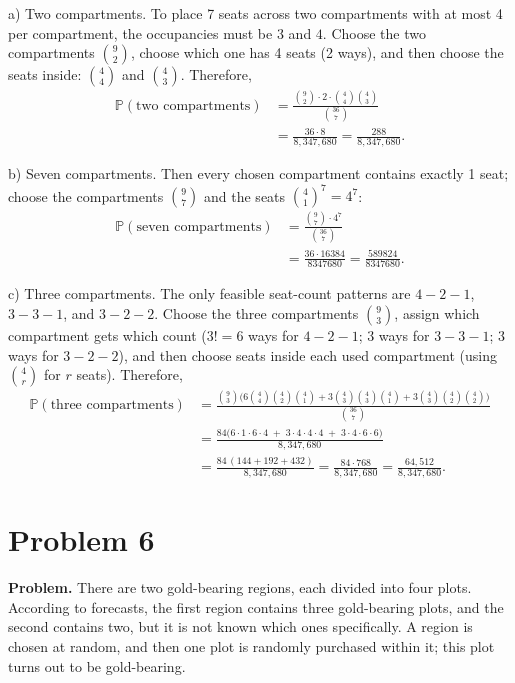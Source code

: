 \documentclass{article}
\begin{document}
a) Two compartments. To place 7 seats across two compartments with at most 4 per compartment, the occupancies must be \(3\) and \(4\). Choose the two compartments \(\binom{9}{2}\), choose which one has 4 seats (2 ways), and then choose the seats inside: \(\binom{4}{4}\) and \(\binom{4}{3}\). Therefore,
\begin{align*}
\mathbb{P}(\text{two compartments})
&= \frac{\binom{9}{2}\cdot 2 \cdot \binom{4}{4}\binom{4}{3}}{\binom{36}{7}} \\
&= \frac{36 \cdot 8}{8{,}347{,}680} = \frac{288}{8{,}347{,}680}.
\end{align*}

b) Seven compartments. Then every chosen compartment contains exactly 1 seat; choose the compartments \(\binom{9}{7}\) and the seats \(\binom{4}{1}^7=4^7\):
\begin{align*}
\mathbb{P}(\text{seven compartments})
&= \frac{\binom{9}{7}\cdot 4^7}{\binom{36}{7}} \\
&= \frac{36 \cdot 16384}{8347680} = \frac{589824}{8347680}.
\end{align*}

c) Three compartments. The only feasible seat-count patterns are \(4\!-\!2\!-\!1\), \(3\!-\!3\!-\!1\), and \(3\!-\!2\!-\!2\).
Choose the three compartments \(\binom{9}{3}\), assign which compartment gets which count
(\(3!=6\) ways for \(4\!-\!2\!-\!1\); \(3\) ways for \(3\!-\!3\!-\!1\); \(3\) ways for \(3\!-\!2\!-\!2\)),
and then choose seats inside each used compartment (using \(\binom{4}{r}\) for \(r\) seats). Therefore,
\begin{align*}
\mathbb{P}(\text{three compartments})
&= \frac{\binom{9}{3}\Big(6\binom{4}{4}\binom{4}{2}\binom{4}{1}
+3\binom{4}{3}\binom{4}{3}\binom{4}{1}
+3\binom{4}{3}\binom{4}{2}\binom{4}{2}\Big)}{\binom{36}{7}} \\
&= \frac{84\Big(6\cdot 1\cdot 6\cdot 4 \;+\; 3\cdot 4\cdot 4\cdot 4 \;+\; 3\cdot 4\cdot 6\cdot 6\Big)}{8{,}347{,}680} \\
&= \frac{84\,(144+192+432)}{8{,}347{,}680}
= \frac{84\cdot 768}{8{,}347{,}680}
= \frac{64{,}512}{8{,}347{,}680}.
\end{align*}

\section{Problem 6}

\textbf{Problem.} There are two gold-bearing regions, each divided into four plots. According to forecasts, the first region contains three gold-bearing plots, and the second contains two, but it is not known which ones specifically. A region is chosen at random, and then one plot is randomly purchased within it; this plot turns out to be gold-bearing.
\end{document}
